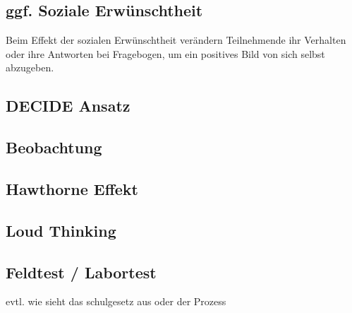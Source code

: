 \subsection{ggf. Soziale Erwünschtheit}
\grqq{}Beim Effekt der sozialen Erwünschtheit verändern Teilnehmende ihr Verhalten oder ihre Antworten bei Fragebogen, um ein positives Bild von sich selbst abzugeben.\glqq 

\subsection{DECIDE Ansatz}
\subsection{Beobachtung}
\subsection{Hawthorne Effekt}
\subsection{Loud Thinking}
\subsection{Feldtest / Labortest}

evtl. wie sieht das schulgesetz aus oder der Prozess

